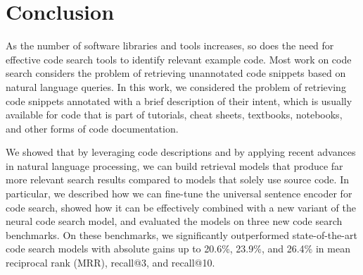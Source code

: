 \documentclass[12pt,conference, onecolumn]{IEEEtran}
\begin{document}
\section{Conclusion}

As the number of software libraries and tools increases, so does the need for effective code search tools to identify relevant example code. Most work on code search considers the problem of retrieving unannotated code snippets based on natural language queries. In this work, we considered the problem of retrieving code snippets annotated with a brief description of their intent, which is usually available for code that is part of tutorials, cheat sheets, textbooks, notebooks, and other forms of code documentation.

We showed that by leveraging code descriptions and by applying recent advances in natural language processing, we can build retrieval models that produce far more relevant search results compared to models that solely use source code. In particular, we described how we can fine-tune the universal sentence encoder for code search, showed how it can be effectively combined with a new variant of the neural code search model, and evaluated the models on three new code search benchmarks. 
On these benchmarks, we significantly outperformed state-of-the-art code search models with absolute gains up to 20.6\%, 23.9\%, and 26.4\% in mean reciprocal rank (MRR), recall@3, and recall@10.


\end{document}
